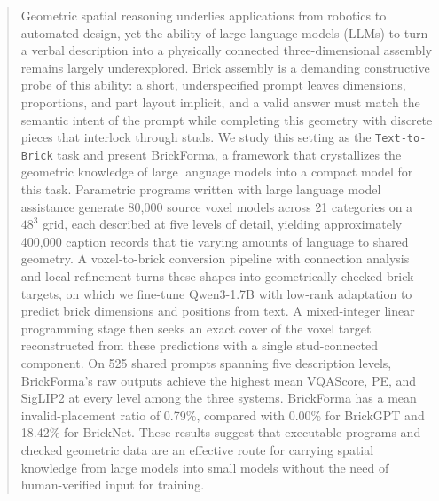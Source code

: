 \begin{abstract}
Geometric spatial reasoning underlies applications from robotics to automated design, yet the ability of large language models (LLMs) to turn a verbal description into a physically connected three-dimensional assembly remains largely underexplored. Brick assembly is a demanding constructive probe of this ability: a short, underspecified prompt leaves dimensions, proportions, and part layout implicit, and a valid answer must match the semantic intent of the prompt while completing this geometry with discrete pieces that interlock through studs. We study this setting as the \texttt{Text-to-Brick} task and present BrickForma, a framework that crystallizes the geometric knowledge of large language models into a compact model for this task. Parametric programs written with large language model assistance generate 80,000 source voxel models across 21 categories on a $48^3$ grid, each described at five levels of detail, yielding approximately 400,000 caption records that tie varying amounts of language to shared geometry. A voxel-to-brick conversion pipeline with connection analysis and local refinement turns these shapes into geometrically checked brick targets, on which we fine-tune Qwen3-1.7B with low-rank adaptation to predict brick dimensions and positions from text. A mixed-integer linear programming stage then seeks an exact cover of the voxel target reconstructed from these predictions with a single stud-connected component. On 525 shared prompts spanning five description levels, BrickForma's raw outputs achieve the highest mean VQAScore, PE, and SigLIP2 at every level among the three systems. BrickForma has a mean invalid-placement ratio of 0.79\%, compared with 0.00\% for BrickGPT and 18.42\% for BrickNet. These results suggest that executable programs and checked geometric data are an effective route for carrying spatial knowledge from large models into small models without the need of human-verified input for training.
\end{abstract}